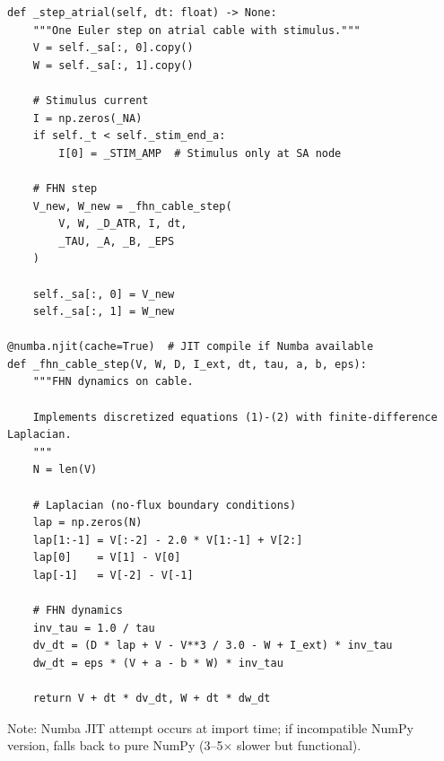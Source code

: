 \documentclass[12pt,a4paper,oneside]{book}
\begin{document}
\begin{Verbatim}[formatcom=\color{black}]
def _step_atrial(self, dt: float) -> None:
    """One Euler step on atrial cable with stimulus."""
    V = self._sa[:, 0].copy()
    W = self._sa[:, 1].copy()
    
    # Stimulus current
    I = np.zeros(_NA)
    if self._t < self._stim_end_a:
        I[0] = _STIM_AMP  # Stimulus only at SA node
    
    # FHN step
    V_new, W_new = _fhn_cable_step(
        V, W, _D_ATR, I, dt,
        _TAU, _A, _B, _EPS
    )
    
    self._sa[:, 0] = V_new
    self._sa[:, 1] = W_new

@numba.njit(cache=True)  # JIT compile if Numba available
def _fhn_cable_step(V, W, D, I_ext, dt, tau, a, b, eps):
    """FHN dynamics on cable.
    
    Implements discretized equations (1)-(2) with finite-difference Laplacian.
    """
    N = len(V)
    
    # Laplacian (no-flux boundary conditions)
    lap = np.zeros(N)
    lap[1:-1] = V[:-2] - 2.0 * V[1:-1] + V[2:]
    lap[0]    = V[1] - V[0]
    lap[-1]   = V[-2] - V[-1]
    
    # FHN dynamics
    inv_tau = 1.0 / tau
    dv_dt = (D * lap + V - V**3 / 3.0 - W + I_ext) * inv_tau
    dw_dt = eps * (V + a - b * W) * inv_tau
    
    return V + dt * dv_dt, W + dt * dw_dt
\end{Verbatim}

Note: Numba JIT attempt occurs at import time; if incompatible NumPy version, falls back to pure NumPy (3–5$\times$ slower but functional).
\end{document}
